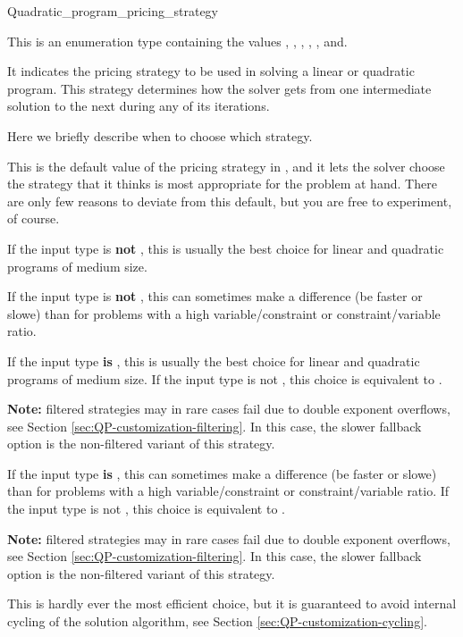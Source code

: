 \begin{ccRefClass}{Quadratic_program_pricing_strategy}


\ccDefinition
This is an enumeration type containing the values
, , 
, ,
, and. 

It indicates the pricing strategy to be used in
solving a linear or quadratic program. This strategy determines
how the solver gets from one intermediate solution to the next
during any of its iterations.

Here we briefly describe when to choose which strategy.

This is the default value of the pricing strategy in
, and it lets the solver choose the
strategy that it thinks is most appropriate for the problem at hand.
There are only few reasons to deviate from this default, but you are
free to experiment, of course.

If the input type is \textbf{not} , this is usually the 
best choice for linear and quadratic programs of medium size.

If the input type is \textbf{not} , this can sometimes
make a difference (be faster or slowe) than  
for problems with a high variable/constraint or constraint/variable ratio.

If the input type \textbf{is} , this is usually the best choice
for linear and quadratic programs of medium size.
If the input type is not , this choice is equivalent 
to .


{\bf Note:} filtered strategies may in rare cases fail due to double 
exponent overflows, see
Section \ref{sec:QP-customization-filtering}. 
In this case, the slower fallback option is
the non-filtered variant  of this strategy.

If the input type \textbf{is} , this can sometimes
make a difference (be faster or slowe) than  
for problems with a high variable/constraint or constraint/variable ratio.
If the input type is not , this choice is equivalent 
to .

{\bf Note:} filtered strategies may in rare cases fail due to double 
exponent overflows, see
Section \ref{sec:QP-customization-filtering}.
In this case, the slower fallback option is
the non-filtered variant  of this strategy.

This is hardly ever the most efficient choice, but it is guaranteed
to avoid internal cycling of the solution algorithm, see
Section \ref{sec:QP-customization-cycling}.

\ccSeeAlso

\end{ccRefClass}
